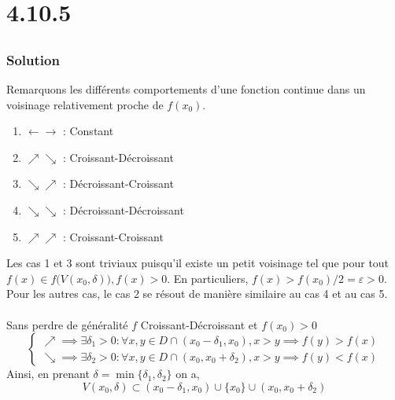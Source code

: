 	\section*{4.10.5}
		\subsection{}
		\subsubsection*{Solution}
			Remarquons les différents comportements d'une fonction continue dans un voisinage relativement proche de $f(x_0)$.
			\begin{enumerate}
				\item $\leftarrow\rightarrow$ : Constant
				\item $\nearrow\searrow$ : Croissant-Décroissant
				\item $\searrow\nearrow$ : Décroissant-Croissant
				\item $\searrow\searrow$ : Décroissant-Décroissant
				\item $\nearrow\nearrow$ : Croissant-Croissant
			\end{enumerate}
			Les cas 1 et 3 sont triviaux puisqu'il existe un petit voisinage tel que pour tout $f(x)\in f\big(V(x_0,\delta)\big), f(x)>0$. En particuliers, $f(x)>f(x_0)/2=\varepsilon>0$.\\
			Pour les autres cas, le cas 2 se résout de manière similaire au cas 4 et au cas 5.\\
			\\
			Sans perdre de généralité $f$ Croissant-Décroissant et $f(x_0)>0$
				\[
				\begin{cases}
						\nearrow\implies\exists\delta_1>0 :\forall x,y\in D\cap (x_0-\delta_1,x_0), x>y \implies f(y)>f(x)\\
						\searrow\implies\exists\delta_2>0 : \forall x,y\in D\cap (x_0,x_0+\delta_2), x>y \implies f(y)<f(x)
				\end{cases}
				\]
			Ainsi, en prenant $\delta = \min\{\delta_1,\delta_2\}$ on a,
				\[V(x_0,\delta)\subset (x_0-\delta_1,x_0)\cup\{x_0\}\cup(x_0,x_0+\delta_2)\]
